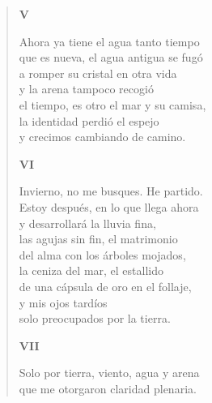 \documentclass[12pt]{article}
\begin{document}
\begin{verse}
{\bfseries\scshape {V}}

Ahora ya tiene el agua tanto tiempo\\
que es nueva, el agua antigua se fugó\\
a romper su cristal en otra vida\\
y la arena tampoco recogió\\
el tiempo, es otro el mar y su camisa,\\
la identidad perdió el espejo\\
y crecimos cambiando de camino.  

{\bfseries\scshape {VI}}

Invierno, no me busques. He partido.\\
Estoy después, en lo que llega ahora\\
y desarrollará la lluvia fina,\\
las agujas sin fin, el matrimonio\\
del alma con los árboles mojados,\\
la ceniza del mar, el estallido\\
de una cápsula de oro en el follaje,\\
y mis ojos tardíos\\
solo preocupados por la tierra.  

{\bfseries\scshape {VII}}

Solo por tierra, viento, agua y arena\\
que me otorgaron claridad plenaria.  

\end{verse}
\end{document}

